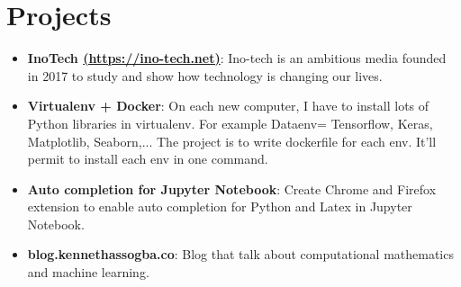 \documentclass[letterpaper,11pt]{article}
\newcommand{\resumeItem}[2]{
  \item\small{
    \textbf{#1}{: #2 \vspace{-2pt}}
  }
}
\newcommand{\resumeSubItem}[2]{\resumeItem{#1}{#2}\vspace{-4pt}}
\newcommand{\resumeSubHeadingListStart}{\begin{itemize}[leftmargin=*]}
\newcommand{\resumeSubHeadingListEnd}{\end{itemize}}
\begin{document}
\section{Projects}
  \resumeSubHeadingListStart
    \resumeSubItem{InoTech \href{https://ino-tech.net/}{(https://ino-tech.net)}}
      {Ino-tech is an ambitious media founded in 2017 to study and show how technology is changing our lives.}
    \resumeSubItem{Virtualenv + Docker}
      {On each new computer, I have to install lots of Python libraries in virtualenv. For example Dataenv= Tensorflow, Keras, Matplotlib, Seaborn,... The project is to write dockerfile for each env. It'll permit to install each env in one command.}
    \resumeSubItem{Auto completion for Jupyter Notebook}
      {Create Chrome and Firefox extension to enable auto completion for Python and Latex in Jupyter Notebook.}
    \resumeSubItem{blog.kennethassogba.co}
      {Blog that talk about computational mathematics and machine learning.}
  \resumeSubHeadingListEnd

%


\end{document}
